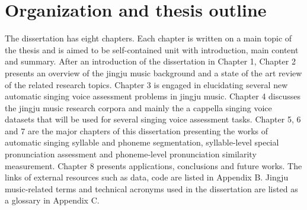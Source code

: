 \section{Organization and thesis outline}

The dissertation has eight chapters. Each chapter is written on a main topic of the thesis and is aimed to be self-contained unit with introduction, main content and summary. After an introduction of the dissertation in Chapter 1, Chapter 2 presents an overview of the jingju music background and a  state of the art review of the related research topics. Chapter 3 is engaged in elucidating several new automatic singing voice assessment problems in jingju music. Chapter 4 discusses the jingju music research corpora and mainly the a cappella singing voice datasets that will be used for several singing voice assessment tasks. Chapter 5, 6 and 7 are the major chapters of this dissertation presenting the works of automatic singing syllable and phoneme segmentation, syllable-level special pronunciation assessment and phoneme-level pronunciation similarity measurement. Chapter 8 presents applications, conclusions and future works. The links of external resources such as data, code are listed in Appendix B. Jingju music-related terms and technical acronyms used in the dissertation are listed as a glossary in Appendix C. 


